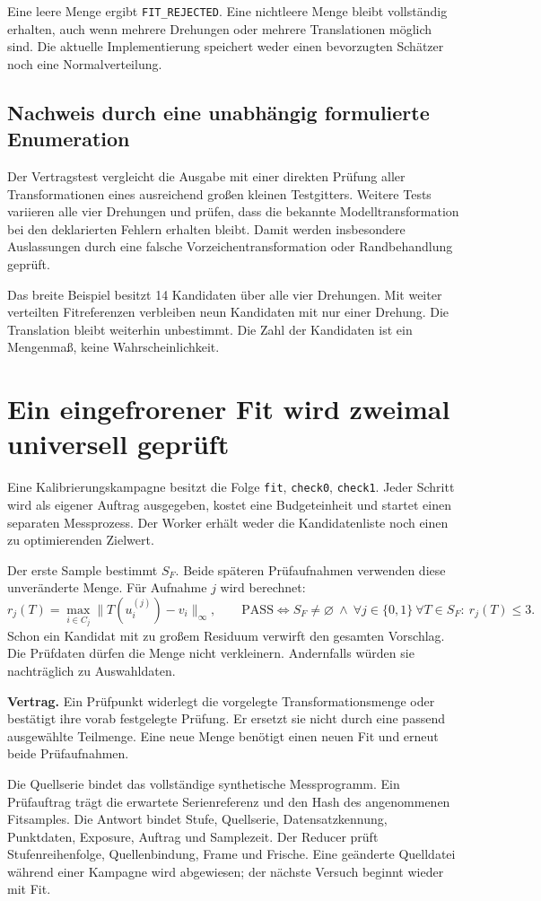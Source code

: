 \documentclass[11pt,a4paper]{article}
\newcommand{\contract}[1]{\vspace{3pt}\noindent\colorbox{pale}{\parbox{\dimexpr\linewidth-2\fboxsep}{\textbf{Vertrag.} #1}}\vspace{5pt}}
\newcommand{\nextsection}[2]{\clearpage{\color{accent}\small\textsf{#1}}\section{#2}}
\begin{document}
Eine leere Menge ergibt \texttt{FIT\_REJECTED}. Eine nichtleere
Menge bleibt vollständig erhalten, auch wenn mehrere Drehungen
oder mehrere Translationen möglich sind. Die aktuelle Implementierung
speichert weder einen bevorzugten Schätzer noch eine Normalverteilung.

\subsection{Nachweis durch eine unabhängig formulierte Enumeration}
Der Vertragstest vergleicht die Ausgabe mit einer direkten Prüfung
aller Transformationen eines ausreichend großen kleinen Testgitters.
Weitere Tests variieren alle vier Drehungen und prüfen, dass die
bekannte Modelltransformation bei den deklarierten Fehlern erhalten
bleibt. Damit werden insbesondere Auslassungen durch eine falsche
Vorzeichentransformation oder Randbehandlung geprüft.

Das breite Beispiel besitzt 14 Kandidaten über alle vier Drehungen.
Mit weiter verteilten Fitreferenzen verbleiben neun Kandidaten mit
nur einer Drehung. Die Translation bleibt weiterhin unbestimmt.
Die Zahl der Kandidaten ist ein Mengenmaß, keine Wahrscheinlichkeit.

\nextsection{62 / GETRENNTE AUFNAHMEN}{Ein eingefrorener Fit wird zweimal universell geprüft}
Eine Kalibrierungskampagne besitzt die Folge
\texttt{fit}, \texttt{check0}, \texttt{check1}. Jeder Schritt wird
als eigener Auftrag ausgegeben, kostet eine Budgeteinheit und
startet einen separaten Messprozess. Der Worker erhält weder die
Kandidatenliste noch einen zu optimierenden Zielwert.

Der erste Sample bestimmt $S_F$. Beide späteren Prüfaufnahmen
verwenden diese unveränderte Menge. Für Aufnahme $j$ wird berechnet:
\[
 r_j(T)=\max_{i\in C_j}\|T(u_i^{(j)})-v_i\|_\infty,
 \qquad
 \mathrm{PASS}\iff S_F\ne\varnothing\ \land\
 \forall j\in\{0,1\}\ \forall T\in S_F:\ r_j(T)\leq3.
\]
Schon ein Kandidat mit zu großem Residuum verwirft den gesamten
Vorschlag. Die Prüfdaten dürfen die Menge nicht verkleinern.
Andernfalls würden sie nachträglich zu Auswahldaten.

\contract{Ein Prüfpunkt widerlegt die vorgelegte Transformationsmenge
oder bestätigt ihre vorab festgelegte Prüfung. Er ersetzt sie nicht
durch eine passend ausgewählte Teilmenge. Eine neue Menge benötigt
einen neuen Fit und erneut beide Prüfaufnahmen.}

Die Quellserie bindet das vollständige synthetische Messprogramm.
Ein Prüfauftrag trägt die erwartete Serienreferenz und den Hash
des angenommenen Fitsamples. Die Antwort bindet Stufe, Quellserie,
Datensatzkennung, Punktdaten, Exposure, Auftrag und Samplezeit.
Der Reducer prüft Stufenreihenfolge, Quellenbindung, Frame und
Frische. Eine geänderte Quelldatei während einer Kampagne wird
abgewiesen; der nächste Versuch beginnt wieder mit Fit.
\end{document}
